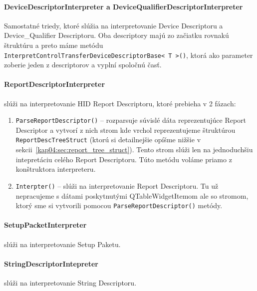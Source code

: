 \paragraph{DeviceDescriptorInterpreter a DeviceQualifierDescriptorInterpreter}
\hfill \break
Samostatné triedy, ktoré slúžia na interpretovanie Device Descriptoru a \newline Device\_Qualifier Descriptoru. Oba descriptory majú zo začiatku rovnakú štruktúru a preto máme metódu \newline \texttt{InterpretControlTransferDeviceDescriptorBase\textless~T~\textgreater()}, ktorá ako parameter zoberie jeden z descriptorov a vyplní spoločnú časť.

\paragraph{ReportDescriptorInterpreter} slúži na interpretovanie HID Report Descriptoru, ktoré prebieha v 2 fázach:
\begin{enumerate}
\item \texttt{ParseReportDescriptor()} -- rozparsuje súvislé dáta reprezentujúce Report Descriptor a vytvorí z nich strom kde vrchol reprezentujeme štruktúrou \texttt{ReportDescTreeStruct} (ktorú si detailnejšie opíšme nižšie v sekcii~\ref{kap04:sec:report_tree_struct}). Tento strom slúži len na jednoduchšiu intepretáciu celého Report Descriptoru. Túto metódu voláme priamo z konštruktora interpreteru.
\item \texttt{Interpter()} -- slúži na interpretovanie Report Descriptoru. Tu už nepracujeme s dátami poskytnutými QTableWidgetItemom ale so stromom, ktorý sme si vytvorili pomocou \texttt{ParseReportDescriptor()} metódy.
\end{enumerate}

\paragraph{SetupPacketInterpreter} slúži na interpretovanie Setup Paketu.

\paragraph{StringDescriptorIntepreter} slúži na interpretovanie String Descriptoru.

